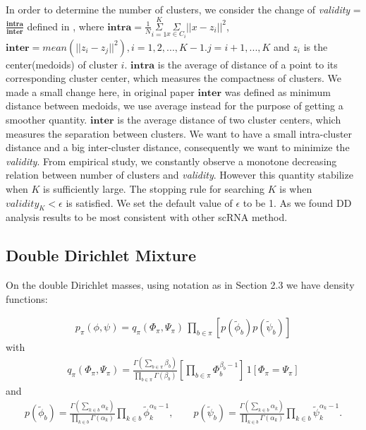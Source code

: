 \documentclass[aoas,preprint]{imsart}
\begin{document}
In order to determine the number of clusters, we consider the change of {\em validity} = $\frac{\textbf{intra}}{\textbf{inter}}$ defined in \cite{selK}, where $\textbf{intra} = \frac{1}{N}\overset{K}{\underset{i = 1}{\Sigma}}\underset{x \in C_i}{\Sigma} ||x - z_i||^2$, $\textbf{inter} = mean( || z_i - z_j||^2), i = 1,2,...,K-1. j = i+1,...,K$ and $z_i$ is the center(medoids) of cluster $i$. $\textbf{intra}$ is the average of distance of a point to its corresponding cluster center, which measures the compactness of clusters. We made a small change here, in original paper $\textbf{inter}$ was defined as minimum distance between medoids, we use average instead for the purpose of getting a smoother quantity. $\textbf{inter}$ is the average distance of two cluster centers, which measures the separation between clusters. We want to have a small intra-cluster distance and a big inter-cluster distance, consequently we want to minimize the {\em validity}. From empirical study, we constantly observe a monotone decreasing relation between number of clusters and {\em validity}. However this quantity stabilize when $K$ is sufficiently large. The stopping rule for searching $K$ is when $validity_{K}  < \epsilon$ is satisfied. We set the default value of  $\epsilon$ to be 1.  As we found DD analysis results to be most consistent with other scRNA method.




\subsection{Double Dirichlet Mixture}

On the double Dirichlet masses, using notation as in Section 2.3 we have density functions:


\begin{eqnarray*}
p_\pi(\phi,\psi) =
         q_\pi( \Phi_\pi, \Psi_\pi  ) \, \prod_{b \in \pi}  \left[
         p( \tilde \phi_b ) p( \tilde \psi_b ) \right]
\end{eqnarray*}
with
\begin{eqnarray*}
q_\pi( \Phi_\pi, \Psi_\pi  )
= \frac{\Gamma(\sum_{b\in \pi} \beta_b)}{
 \prod_{b \in \pi} \Gamma( \beta_b )} \left[\prod_{b \in \pi} \Phi_b^{\beta_b-1} \right] \,
 1\left[ \Phi_\pi = \Psi_\pi \right]
\end{eqnarray*}
and
\begin{eqnarray*}
p( \tilde \phi_b ) =
\frac{ \Gamma( \sum_{k\in b} \alpha_k ) }{ \prod_{k\in b} \Gamma(\alpha_k) }
 \prod_{k \in b} \tilde \phi_k^{\alpha_k -1 },
\qquad
p( \tilde \psi_b )
=
\frac{ \Gamma( \sum_{k\in b} \alpha_k ) }{ \prod_{k\in b} \Gamma(\alpha_k) }
\prod_{k \in b} \tilde \psi_k^{\alpha_k -1 }.
\end{eqnarray*}
\end{document}
